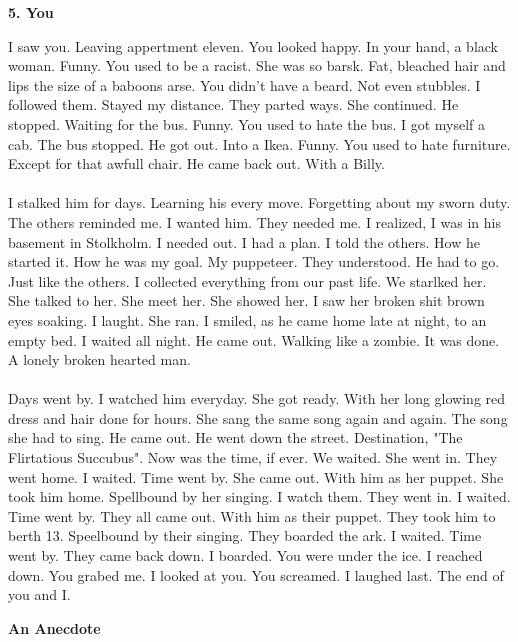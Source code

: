 \documentclass[]{article}
\begin{document}
\newpage

\begin{center}
	\large\textbf{5. You}
\end{center}

I saw you. Leaving appertment eleven. You looked happy. In your hand, a black woman. Funny. You used to be a racist. She was so barsk. Fat, bleached hair and lips the size of a baboons arse. You didn't have a beard. Not even stubbles. I followed them. Stayed my distance. They parted ways. She continued. He stopped. Waiting for the bus. Funny. You used to hate the bus. I got myself a cab. The bus stopped. He got out. Into a Ikea. Funny. You used to hate furniture. Except for that awfull chair. He came back out. With a Billy.
\\ \\
I stalked him for days. Learning his every move. Forgetting about my sworn duty. The others reminded me. I wanted him. They needed me. I realized, I was in his basement in Stolkholm. I needed out. I had a plan. I told the others. How he started it. How he was my goal. My puppeteer. They understood. He had to go. Just like the others. I collected everything from our past life. We starlked her. She talked to her. She meet her. She showed her. I saw her broken shit brown eyes soaking. I laught. She ran. I smiled, as he came home late at night, to an empty bed. I waited all night. He came out. Walking like a zombie. It was done. A lonely broken hearted man.
\\ \\
Days went by. I watched him everyday. She got ready. With her long glowing red dress and hair done for hours. She sang the same song again and again. The song she had to sing. He came out. He went down the street. Destination, "The Flirtatious Succubus". Now was the time, if ever. We waited. She went in. They went home. I waited. Time went by. She came out. With him as her puppet. She took him home. Spellbound by her singing. I watch them. They went in. I waited. Time went by. They all came out. With him as their puppet. They took him to berth 13. Speelbound by their singing. They boarded the ark. I waited. Time went by. They came back down. I boarded. You were under the ice. I reached down. You grabed me. I looked at you. You screamed. I laughed last. The end of you and I.

\newpage

\begin{center}
	\Large\textbf{An Anecdote}
\end{center}
\end{document}
